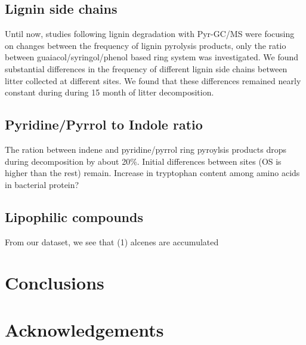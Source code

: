 \documentclass[preprint,review,12pt]{elsarticle}
\begin{document}
\subsection{Lignin side chains}
Until now, studies following lignin degradation with Pyr-GC/MS were focusing on changes between the frequency of lignin pyrolysis products, only the ratio between guaiacol/syringol/phenol based ring system was investigated. We found substantial differences in the frequency of different lignin side chains between litter collected at different sites. We found that these differences remained nearly constant during during 15 month of litter decomposition. 

\subsection{Pyridine/Pyrrol to Indole ratio}

The ration between indene and pyridine/pyrrol ring pyroylsis products drops during decomposition by about 20\%. Initial differences between sites (OS is higher than the rest) remain. 
Increase in tryptophan content among amino acids in bacterial protein?

\subsection{Lipophilic compounds}

From our dataset, we see that (1) alcenes are accumulated 

\section{Conclusions}


\section{Acknowledgements}



\end{document}
